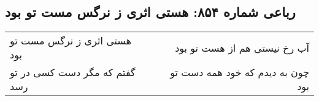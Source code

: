 \begin{center}
\section*{رباعی شماره ۸۵۴: هستی اثری ز نرگس مست تو بود}
\label{sec:0854}
\begin{longtable}{l p{0.5cm} r}
هستی اثری ز نرگس مست تو بود
&&
آب رخ نیستی هم از هست تو بود
\\
گفتم که مگر دست کسی در تو رسد
&&
چون به دیدم که خود همه دست تو بود
\\
\end{longtable}
\end{center}
